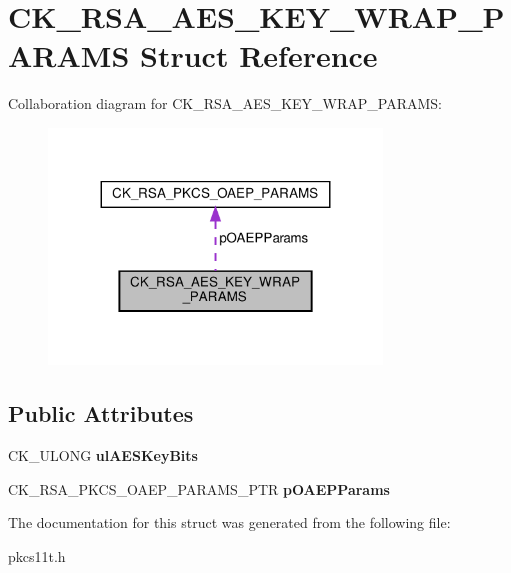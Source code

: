 \hypertarget{struct_c_k___r_s_a___a_e_s___k_e_y___w_r_a_p___p_a_r_a_m_s}{}\section{C\+K\+\_\+\+R\+S\+A\+\_\+\+A\+E\+S\+\_\+\+K\+E\+Y\+\_\+\+W\+R\+A\+P\+\_\+\+P\+A\+R\+A\+MS Struct Reference}
\label{struct_c_k___r_s_a___a_e_s___k_e_y___w_r_a_p___p_a_r_a_m_s}


Collaboration diagram for C\+K\+\_\+\+R\+S\+A\+\_\+\+A\+E\+S\+\_\+\+K\+E\+Y\+\_\+\+W\+R\+A\+P\+\_\+\+P\+A\+R\+A\+MS\+:
\nopagebreak
\begin{figure}[H]
\begin{center}
\leavevmode
\includegraphics[width=251pt]{struct_c_k___r_s_a___a_e_s___k_e_y___w_r_a_p___p_a_r_a_m_s__coll__graph}
\end{center}
\end{figure}
\subsection*{Public Attributes}
\begin{DoxyCompactItemize}
\item 
\mbox{\label{struct_c_k___r_s_a___a_e_s___k_e_y___w_r_a_p___p_a_r_a_m_s_a9d445bef9432d7eaa0b38de0ba66a3d4}} 
C\+K\+\_\+\+U\+L\+O\+NG {\bfseries ul\+A\+E\+S\+Key\+Bits}
\item 
\mbox{\label{struct_c_k___r_s_a___a_e_s___k_e_y___w_r_a_p___p_a_r_a_m_s_a6319224494833f7120b3e003b888a435}} 
C\+K\+\_\+\+R\+S\+A\+\_\+\+P\+K\+C\+S\+\_\+\+O\+A\+E\+P\+\_\+\+P\+A\+R\+A\+M\+S\+\_\+\+P\+TR {\bfseries p\+O\+A\+E\+P\+Params}
\end{DoxyCompactItemize}


The documentation for this struct was generated from the following file\+:\begin{DoxyCompactItemize}
\item 
pkcs11t.\+h\end{DoxyCompactItemize}
